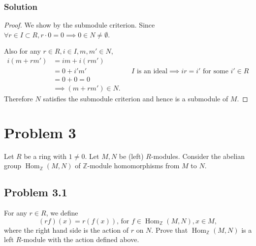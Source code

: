 \documentclass{article}
\theoremstyle{plain}
\newcommand{\Z}{\mathbb{Z}}
\DeclareMathOperator{\Hom}{Hom}
\begin{document}
\subsubsection*{Solution}
\begin{proof}
  We show by the submodule criterion. Since $\forall r\in I\subset R, r\cdot0=0\implies 0\in N\ne\emptyset$.

  Also for any $r\in R, i\in I, m,m'\in N$,
  \begin{align*}
    i(m+rm')&=im+i(rm')\\
            &=0+i'm' &&I\text{ is an ideal}\implies ir=i'\text{ for some }i'\in R\\
            &=0+0=0\\
            &\implies (m+rm')\in N.
  \end{align*}
  Therefore $N$ satisfies the submodule criterion and hence is a submodule of $M$.
\end{proof}

\section*{Problem 3}
Let $R$ be a ring with $1\ne0$. Let $M,N$ be (left) $R$-modules. Consider the
abelian group $\Hom_{\Z}(M,N)$ of $\Z$-module homomorphisms from $M$ to $N$.
\subsection*{Problem 3.1}
For any $r\in R$, we define \[(rf)(x)=r(f(x))\text{, for }f\in\Hom_{\Z}(M,N),x\in M,\]
where the right hand side is the action of $r$ on $N$. Prove that
$\Hom_{\Z}(M, N)$ is a left $R$-module with the action defined above.
\end{document}
